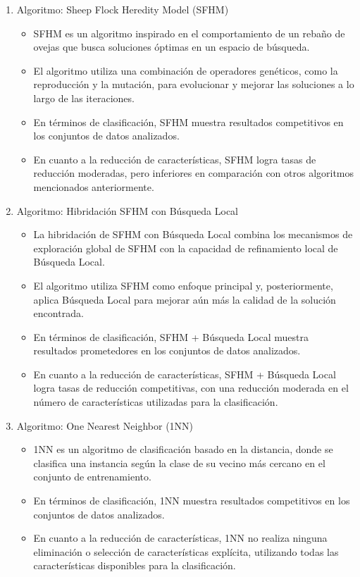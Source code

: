 \begin{enumerate}

\item Algoritmo: Sheep Flock Heredity Model (SFHM)

\begin{itemize}
	\item SFHM es un algoritmo inspirado en el comportamiento de un rebaño de ovejas que busca soluciones óptimas en un espacio de búsqueda.
	\item El algoritmo utiliza una combinación de operadores genéticos, como la reproducción y la mutación, para evolucionar y mejorar las soluciones a lo largo de las iteraciones.
	\item En términos de clasificación, SFHM muestra resultados competitivos en los conjuntos de datos analizados.
	\item En cuanto a la reducción de características, SFHM logra tasas de reducción moderadas, pero inferiores en comparación con otros algoritmos mencionados anteriormente.
\end{itemize}

\item Algoritmo: Hibridación SFHM con Búsqueda Local

\begin{itemize}
	\item La hibridación de SFHM con Búsqueda Local combina los mecanismos de exploración global de SFHM con la capacidad de refinamiento local de Búsqueda Local.
	\item El algoritmo utiliza SFHM como enfoque principal y, posteriormente, aplica Búsqueda Local para mejorar aún más la calidad de la solución encontrada.
	\item En términos de clasificación, SFHM + Búsqueda Local muestra resultados prometedores en los conjuntos de datos analizados.
	\item En cuanto a la reducción de características, SFHM + Búsqueda Local logra tasas de reducción competitivas, con una reducción moderada en el número de características utilizadas para la clasificación.
\end{itemize}

	\item Algoritmo: One Nearest Neighbor (1NN)
	
	\begin{itemize}
		\item 1NN es un algoritmo de clasificación basado en la distancia, donde se clasifica una instancia según la clase de su vecino más cercano en el conjunto de entrenamiento.
		\item En términos de clasificación, 1NN muestra resultados competitivos en los conjuntos de datos analizados.
		\item En cuanto a la reducción de características, 1NN no realiza ninguna eliminación o selección de características explícita, utilizando todas las características disponibles para la clasificación.
	\end{itemize}
	

\end{enumerate}

